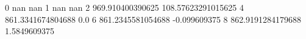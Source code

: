 0 nan nan
1 nan nan
2 969.910400390625 108.57623291015625
4 861.3341674804688 0.0
6 861.2345581054688 -0.099609375
8 862.9191284179688 1.5849609375
